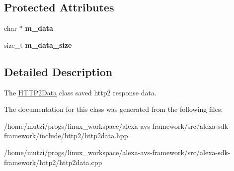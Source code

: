 \subsection*{Protected Attributes}
\begin{DoxyCompactItemize}
\item 
\mbox{\label{classhttp2_1_1HTTP2Data_a451ea76757251d8f2da54ada3077e7ae}} 
char $\ast$ {\bfseries m\+\_\+data}
\item 
\mbox{\label{classhttp2_1_1HTTP2Data_a7b5cd30eb9045040af138c78ec63ee14}} 
size\+\_\+t {\bfseries m\+\_\+data\+\_\+size}
\end{DoxyCompactItemize}


\subsection{Detailed Description}
The \hyperlink{classhttp2_1_1HTTP2Data}{H\+T\+T\+P2\+Data} class saved http2 response data. 

The documentation for this class was generated from the following files\+:\begin{DoxyCompactItemize}
\item 
/home/mutzi/progs/linux\+\_\+workspace/alexa-\/avs-\/framework/src/alexa-\/sdk-\/framework/include/http2/http2data.\+hpp\item 
/home/mutzi/progs/linux\+\_\+workspace/alexa-\/avs-\/framework/src/alexa-\/sdk-\/framework/http2/http2data.\+cpp\end{DoxyCompactItemize}
